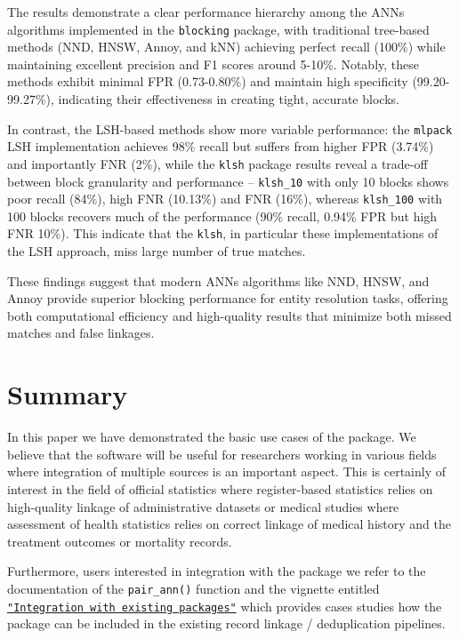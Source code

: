 The results demonstrate a clear performance hierarchy among the ANNs algorithms implemented in the \texttt{blocking} package, with traditional tree-based methods (NND, HNSW, Annoy, and kNN) achieving perfect recall (100\%) while maintaining excellent precision and F1 scores around 5-10\%. Notably, these methods exhibit minimal FPR (0.73-0.80\%) and maintain high specificity (99.20-99.27\%), indicating their effectiveness in creating tight, accurate blocks.

In contrast, the LSH-based methods show more variable performance: the \texttt{mlpack} LSH implementation achieves 98\% recall but suffers from higher FPR (3.74\%) and importantly FNR (2\%), while the \texttt{klsh} package results reveal a trade-off between block granularity and performance -- \texttt{klsh\_10} with only 10 blocks shows poor recall (84\%), high FNR (10.13\%) and FNR (16\%), whereas \texttt{klsh\_100} with 100 blocks recovers much of the performance (90\% recall, 0.94\% FPR but high FNR 10\%). This indicate that the \texttt{klsh}, in particular these implementations of the LSH approach, miss large number of true matches.

These findings suggest that modern ANNs algorithms like NND, HNSW, and Annoy provide superior blocking performance for entity resolution tasks, offering both computational efficiency and high-quality results that minimize both missed matches and false linkages.

\section{Summary}\label{summary}

In this paper we have demonstrated the basic use cases of the
 package. We believe that the software will be useful
for researchers working in various fields where integration of multiple
sources is an important aspect. This is certainly of interest in the field of official statistics where register-based statistics relies on high-quality linkage of administrative datasets or medical studies where assessment of health statistics relies on correct linkage of medical history and the treatment outcomes or mortality records.

Furthermore, users interested in integration with the  package we
refer to the documentation of the \texttt{pair\_ann()} function and the vignette
entitled
\href{https://cran.r-project.org/web/packages/blocking/vignettes/v3-integration.html}{\texttt{"Integration\ with\ existing\ packages"}} which provides cases studies how the  package can be included in the existing record linkage / deduplication pipelines.

